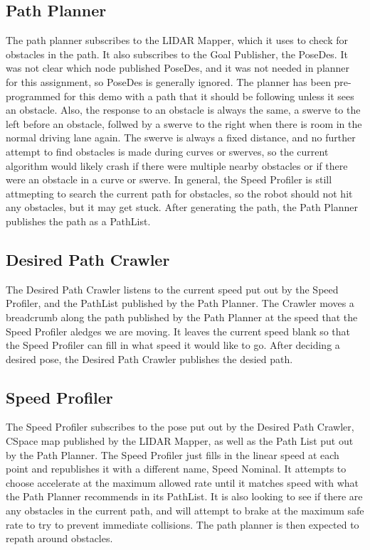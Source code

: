 \documentclass{article}
\begin{document}
\subsection{Path Planner}

The path planner subscribes to the LIDAR Mapper, which it uses to check for obstacles in the path. It also subscribes to the Goal Publisher, the PoseDes.  It was not clear which node published PoseDes, and it was not needed in planner for this assignment, so PoseDes is generally ignored.  The planner has been pre-programmed for this demo with a path that it should be following unless it sees an obstacle.  Also, the response to an obstacle is always the same, a swerve to the left before an obstacle, follwed by a swerve to the right when there is room in the normal driving lane again.  The swerve is always a fixed distance, and no further attempt to find obstacles is made during curves or swerves, so the current algorithm would likely crash if there were multiple nearby obstacles or if there were an obstacle in a curve or swerve.  In general, the Speed Profiler is still attmepting to search the current path for obstacles, so the robot should not hit any obstacles, but it may get stuck.  After generating the path, the Path Planner publishes the path as a PathList.

\subsection{Desired Path Crawler}

The Desired Path Crawler listens to the current speed put out by the Speed Profiler, and the PathList published by the Path Planner. The Crawler moves a breadcrumb along the path published by the Path Planner at the speed that the Speed Profiler aledges we are moving.  It leaves the current speed blank so that the Speed Profiler can fill in what speed it would like to go.  After deciding a desired pose, the Desired Path Crawler publishes the desied path.

\subsection{Speed Profiler}

The Speed Profiler subscribes to the pose put out by the Desired Path Crawler, CSpace map published by the LIDAR Mapper, as well as the Path List put out by the Path Planner.  The Speed Profiler just fills in the linear speed at each point and republishes it with a different name, Speed Nominal.  It attempts to choose accelerate at the maximum allowed rate until it matches speed with what the Path Planner recommends in its PathList.  It is also looking to see if there are any obstacles in the current path, and will attempt to brake at the maximum safe rate to try to prevent immediate collisions.  The path planner is then expected to repath around obstacles. 
\end{document}
